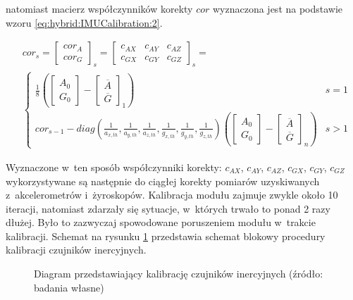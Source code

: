 natomiast macierz współczynników korekty $cor$ wyznaczona jest na podstawie wzoru \ref{eq:hybrid:IMUCalibration:2}.

\begin{equation}
	\begin{split}
		&cor_s = \begin{bmatrix}cor_A\\ cor_G\end{bmatrix}_s = \begin{bmatrix}c_{AX} & c_{AY} & c_{AZ} \\ c_{GX} & c_{GY} & c_{GZ}\end{bmatrix}_s = \\
		&\begin{cases}
		\frac{1}{8}\left(\begin{bmatrix}A_0 \\ G_0\end{bmatrix} - \begin{bmatrix}\overline{A}\\ \overline{G}\end{bmatrix}_1\right) & s = 1\\
		cor_{s-1} - diag(\frac{1}{a_{x,th}},\frac{1}{a_{y,th}},\frac{1}{a_{z,th}},\frac{1}{g_{x,th}},\frac{1}{g_{y,th}},\frac{1}{g_{z,th}}) 
		\left(\begin{bmatrix}A_0 \\ G_0\end{bmatrix} - \begin{bmatrix}\overline{A}\\ \overline{G}\end{bmatrix}_n\right) & s > 1
		\end{cases}
	\end{split}
	\label{eq:hybrid:IMUCalibration:2}
\end{equation}

Wyznaczone w~ten sposób współczynniki korekty: $c_{AX}$, $c_{AY}$, $c_{AZ}$, $c_{GX}$, $c_{GY}$, $c_{GZ}$ wykorzystywane są następnie do ciągłej korekty pomiarów uzyskiwanych z~akcelerometrów i~żyroskopów. Kalibracja modułu zajmuje zwykle około 10 iteracji, natomiast zdarzały się sytuacje, w~których trwało to ponad 2 razy dłużej. Było to zazwyczaj spowodowane poruszeniem modułu w~trakcie kalibracji. Schemat na rysunku \ref{fig:hybrid:IMUCalibration} przedstawia schemat blokowy procedury kalibracji czujników inercyjnych.

\begin{figure}[!htb]
	\scalebox{0.55}{		
		
	}
	\caption{Diagram przedstawiający kalibrację czujników inercyjnych (źródło: badania własne)}
	\label{fig:hybrid:IMUCalibration}
\end{figure}


